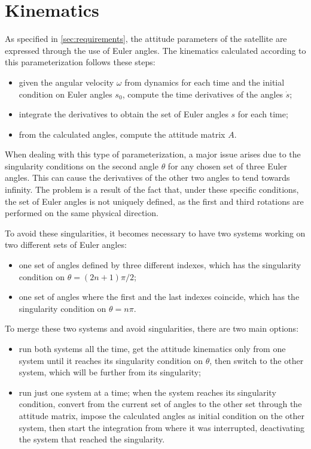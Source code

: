 \section{Kinematics}
\label{sec:kinematics}

As specified in \autoref{sec:requirements}, the attitude parameters of the satellite are expressed through the use of Euler angles. The kinematics calculated according to this parameterization follows these steps:

\begin{itemize}[wide,itemsep=3pt,topsep=3pt]
    \item given the angular velocity $\omega$ from dynamics for each time and the initial condition on Euler angles $s_0$, compute the time derivatives of the angles $\dot{s}$;
    \item integrate the derivatives to obtain the set of Euler angles $s$ for each time;
    \item from the calculated angles, compute the attitude matrix $A$.
\end{itemize}

When dealing with this type of parameterization, a major issue arises due to the singularity conditions on the second angle $\theta$ for any chosen set of three Euler angles. This can cause the derivatives of the other two angles to tend towards infinity. The problem is a result of the fact that, under these specific conditions, the set of Euler angles is not uniquely defined, as the first and third rotations are performed on the same physical direction.

To avoid these singularities, it becomes necessary to have two systems working on two different sets of Euler angles:

\begin{itemize}[wide,itemsep=3pt,topsep=3pt]
    \item one set of angles defined by three different indexes, which has the singularity condition on $\theta = (2n+1) \pi / 2$;
    \item one set of angles where the first and the last indexes coincide, which has the singularity condition on $\theta = n \pi$.
\end{itemize}

To merge these two systems and avoid singularities, there are two main options:

\begin{itemize}[wide,itemsep=3pt,topsep=3pt]
    \item run both systems all the time, get the attitude kinematics only from one system until it reaches its singularity condition on $\theta$, then switch to the other system, which will be further from its singularity;
    \item run just one system at a time; when the system reaches its singularity condition, convert from the current set of angles to the other set through the attitude matrix, impose the calculated angles as initial condition on the other system, then start the integration from where it was interrupted, deactivating the system that reached the singularity.
\end{itemize}

